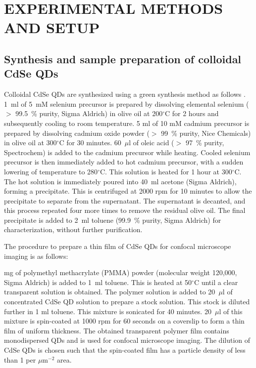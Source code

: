 \documentclass[%
 aip,
 amsmath,amssymb,
 reprint,%
]{revtex4-1}
\begin{document}
\section{\textbf{EXPERIMENTAL METHODS AND SETUP}}

\subsection{\textbf{Synthesis and sample preparation of colloidal CdSe QDs}}
Colloidal CdSe QDs are synthesized using a green synthesis method as follows \cite{AAK}. 1~ml of 5~mM selenium precursor is prepared by dissolving elemental selenium ($>$ 99.5~\% purity, Sigma Aldrich) in olive oil at 200$^\circ$C for 2 hours and subsequently cooling to room temperature. 5 ml of 10 mM cadmium precursor is prepared by dissolving cadmium oxide powder ($>$ 99~\% purity, Nice Chemicals) in olive oil at 300$^\circ$C for 30 minutes. 60~$\mu$l of oleic acid ($>$ 97~\% purity, Spectrochem) is added to the cadmium precursor while heating. Cooled selenium precursor is then immediately added to hot cadmium precursor, with a sudden lowering of temperature to 280$^\circ$C. This solution is heated for 1 hour at 300$^\circ$C. 
The hot solution is immediately poured into 40~ml acetone (Sigma Aldrich), forming a precipitate. This is centrifuged at 2000 rpm for 10 minutes to allow the precipitate to separate from the supernatant. The supernatant is decanted, and this process repeated four more times to remove the residual olive oil. The final precipitate is added to 2~ml toluene (99.9~\% purity, Sigma Aldrich) for characterization, without further purification.

The procedure to prepare a thin film of CdSe QDs for confocal microscope imaging is as follows: 

 mg of  polymethyl methacrylate (PMMA) powder (molecular weight 120,000, Sigma Aldrich) is added to 1~ml toluene. This is heated at 50$^\circ$C until a clear transparent solution is obtained. The polymer solution is added to 20~$\mu$l of concentrated CdSe QD solution to prepare a stock solution. This stock is diluted further in 1 ml toluene. This mixture is sonicated for 40 minutes. 20~$\mu$l of this mixture is spin-coated at 1000 rpm for 60 seconds on a coverslip to form a thin film of uniform thickness. The obtained transparent polymer film contains monodispersed QDs and is used for confocal microscope imaging. The dilution of CdSe QDs is chosen such that the spin-coated film has a particle density of less than 1 per $\mu$m$^{-2}$ area.
\end{document}
